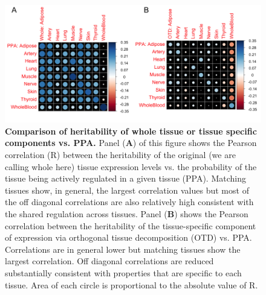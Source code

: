 \documentclass[10pt,letterpaper]{article}
\begin{document}



\begin{figure}[H]
\includegraphics[width=12cm]{Figures/Fig-cor-StephensPr-v-PVE.png}
\caption{{\bf Comparison of heritability of whole tissue or tissue specific components vs. PPA.} 
Panel (\textbf{A}) of this figure shows the Pearson correlation (R) between the heritability of the original (we are calling whole here) tissue expression levels vs. the probability of the tissue being actively regulated in a given tissue (PPA). Matching tissues show, in general, the largest correlation values but most of the off diagonal correlations are also relatively high consistent with the shared regulation across tissues. 
Panel (\textbf{B}) shows the Pearson correlation between the heritability of the tissue-specific component of expression via orthogonal tissue decomposition (OTD) vs. PPA. Correlations are in general lower but matching tissues show the largest correlation. Off diagonal correlations are reduced substantially consistent with properties that are specific to each tissue. 
Area of each circle is proportional to the absolute value of R.
}
\label{fig-corrplot}
\end{figure}
\end{document}
